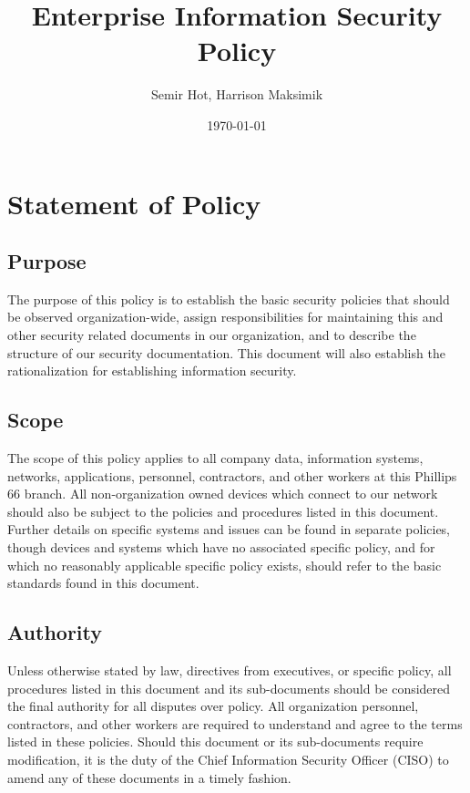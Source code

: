 \documentclass[11pt]{article}
\author{Semir Hot, Harrison Maksimik}
\date{\today}
\title{Enterprise Information Security Policy}
\begin{document}
\maketitle
\tableofcontents


\section{Statement of Policy}
\label{sec:org05139fd}
\subsection{Purpose}
\label{sec:org42651e5}
The purpose of this policy is to establish the basic security policies that should be observed organization-wide, assign responsibilities for maintaining this and other security related documents in our organization, and to describe the structure of our security documentation. This document will also establish the rationalization for establishing information security.

\subsection{Scope}
\label{sec:org190cc05}
The scope of this policy applies to all company data, information systems, networks, applications, personnel, contractors, and other workers at this Phillips 66 branch. All non-organization owned devices which connect to our network should also be subject to the policies and procedures listed in this document. Further details on specific systems and issues can be found in separate policies, though devices and systems which have no associated specific policy, and for which no reasonably applicable specific policy exists, should refer to the basic standards found in this document.

\subsection{Authority}
\label{sec:org33acd22}
Unless otherwise stated by law, directives from executives, or specific policy, all procedures listed in this document and its sub-documents should be considered the final authority for all disputes over policy. All organization personnel, contractors, and other workers are required to understand and agree to the terms listed in these policies. Should this document or its sub-documents require modification, it is the duty of the Chief Information Security Officer (CISO) to amend any of these documents in a timely fashion.
\end{document}
